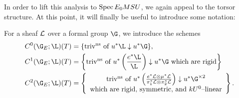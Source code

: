 In order to lift this analysis to $\operatorname{Spec} E_0 MSU$, we again appeal to the torsor structure.  At this point, it will finally be useful to introduce some notation:
\begin{definition}
For a sheaf $\mathcal{L}$ over a formal group $\G$, we introduce the schemes
\begin{align*}
C^0(\G_E; \L)(T) & = \{\text{triv\textsuperscript{ns} of $u^* \L \downarrow u^* \G$}\} , \\
C^1(\G_E; \L)(T) & = \left\{\text{triv\textsuperscript{ns} of $u^* \left( \frac{e^* \L}{\L} \right) \downarrow u^* \G$ which are rigid}\right\} \\
C^2(\G_E; \L)(T) & = \left\{\begin{array}{c}\text{triv\textsuperscript{ns} of $u^*\left(\frac{e^* \sheaf L \otimes \mu^* \sheaf L}{\pi_1^* \sheaf L \otimes \pi_2^* \sheaf L}\right) \downarrow u^* \G^{\times 2}$} \\ \text{which are rigid, symmetric, and $kU^0$--linear} \end{array}\right\}.
\end{align*}
\end{definition}

